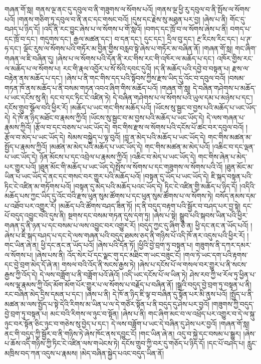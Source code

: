 གཞན་གོ་སླ། གནས་ལྔ་ནང་དུ་དབུལ་བ་ནི་གཟུགས་ལ་སོགས་པའོ། །གནས་ལྔ་ཕྱི་རུ་དབུལ་བ་ནི་སྤོས་ལ་སོགས་པའོ། །གནས་གཅིག་ཏུ་དབུལ་བ་ནི་ནང་དང་གསང་བའོ། །དུས་དང་རྗེས་སུ་མཐུན་པར་བྱ། །ཞེས་པ་ནི། གོང་དུ་བཤད་པ་ཉིད་དོ། །འདི་ནི་རང་བྱུང་ཞེས་པ་ལ་སོགས་པ་གོ་སླའོ། །བགད་དང་ཁྲོ་བ་ལ་སོགས་ཞེས་པ་ནི། བགད་པ་དང་ཁྲོ་བ་དང་། གདུགས་དང་། རྒྱལ་མཚན་དང་། བ་དན་དང་། དུང་དང་། དྲིལ་བུ་དང་། རྔ་{རིངས་རིང་}དང་། པ་ཊ་ཧ་དང་། ལྡོང་རུས་ལ་སོགས་པའི་གཏོར་མ་བྱིན་གྱིས་བརླབ་སྟེ་ཞེས་པ་གཏོར་མ་བཞིན་ནོ། །གཞན་གོ་སླ། གང་ཞིག་གཞན་ལ་ཇི་བཞིན་དུ། །ཞེས་པ་ལ་སོགས་པའི་དོན་ནི་རང་གིས་རང་གི་འཁོར་ལ་མཆོད་པ་དང་། འཁོར་གྱིས་རང་ལ་མཆོད་པ་ལ་སོགས་པ། རང་གི་རྣལ་འབྱོར་པ་སོ་སོའི་དབང་དུའོ། །ད་ནི་མཆོད་པའི་དབྱེ་བ་བསྟན་པ། རྫས་ལ་བརྟེན་ནས་མཆོད་པ་དང་། །ཞེས་པ་ནི་གང་གིས་དད་པའི་སྟོབས་ཀྱིས་རྫས་ཡིད་དུ་འོང་བ་དབུལ་བའོ། །བསམ་གཏན་ཁོ་ནས་མཆོད་པ་ནི་བསམ་གཏན་འབའ་ཞིག་གིས་མཆོད་པའོ། །གཞན་གོ་སླ། དེ་བཞིན་གཤེགས་པ་མཆོད་པ་ཡང་དངོས་སུ་ནི། དང་བ་དང་ཏིང་ངེ་འཛིན་ཏེ། དེ་བཞིན་གཤེགས་པ་ལ་སོགས་པའི་ཡུལ་དམ་པ་མཉེས་པ་དང་། དངོས་གྲུབ་སྩོལ་བའི་ཕྱིར་རོ། །མཆོད་པ་ཡང་གང་གིས་མཆོད་པའོ། །ཡོངས་སུ་སྦྱང་བ་བྱས་པའི་མཆོད་པ་ཡང་ཡོད་དེ། དེ་ཁོ་ན་ཉིད་མཐོང་བ་རྣམས་ཀྱིའོ། །ཡོངས་སུ་སྦྱང་བ་མ་བྱས་པའི་མཆོད་པ་ཡང་ཡོད་དེ། དེ་ལས་གཞན་པ་​ རྣམས་ཀྱིའོ། །རྩོལ་བ་དང་བཅས་པ་ཡང་ཡོད་དེ། གང་གིས་རྫས་ལ་སོགས་པའི་དངོས་པོ་ཚང་བར་དབུལ་བའོ། །རྩོལ་བ་མེད་པ་ཡང་ཡོད་དེ། སེམས་བསྐྱེད་པ་ལྟ་བུའོ། །བླ་ན་མེད་པའི་མཆོད་པ་ཡང་ཡོད་དེ། གང་གིས་མཚན་མ་སྤྱོད་པ་རྣམས་ཀྱིའོ། །མཚན་མ་མེད་པའི་མཆོད་པ་ཡང་ཡོད་དེ། གང་གིས་མཚན་མ་མེད་པའོ། །འཆིང་བ་དང་ལྡན་པ་ཡང་ཡོད་དེ། ཉོན་མོངས་པ་དང་འབྲེལ་པ་རྣམས་ཀྱིའོ། །འཆིང་བ་མེད་པ་ཡང་ཡོད་དེ། གང་གིས་ཞེན་པ་མེད་པར་གྱུར་པའོ། །ཐུན་མོང་གི་མཆོད་པ་ཡང་ཡོད་དེ།སྤོས་ལ་སོགས་པ་དང་གཟུགས་ལ་སོགས་པའི་འོ། །ཐུན་མོང་མ་ཡིན་པ་ཡང་ཡོད་དེ་ནང་དང་གསང་བར་གྱུར་པའི་མཆོད་པའོ། །བསྟན་དུ་ཡོད་པ་ཡང་ཡོད་དེ། ཇི་སྐད་བསྟན་པའི་ཏིང་ངེ་འཛིན་མ་གཏོགས་པའོ། །བསྟན་དུ་མེད་པའི་མཆོད་པའང་ཡོད་དེ། ཏིང་ངེ་འཛིན་གྱི་མཆོད་པ་ཉིད་དོ། །འདིའི་མཆོད་པས་ཀྱང་ཡིད་དུ་འོང་བའི་རྫས་ཕུན་སུམ་ཚོགས་པ་དང་ཕུན་སུམ་ཚོགས་པ་ལ་སོགས་ཏེ། བསོད་ནམས་དམ་པ་འཐོབ་པར་འགྱུར་རོ། །མཆོད་པའི་ཚོགས་བཤད་ཟིན་ཏོ། །ད་ནི་བདུད་བརྟག་པའི་སྦྱོར་བ་བཤད་པར་བྱ་སྟེ། དང་པོ་བདུད་འབྱུང་བའི་དུས་ནི། སྔགས་དང་བསམ་གཏན་དུས་དག་ཏུ། །ཞེས་པ་སྟེ། སྒྲུབ་པའི་སྐབས་ཡིན་པའི་ཕྱིར་གཞན་དུ་ནི་ཉན་པ་དང་བསམ་པ་ལས་འབྱུང་བར་འགྱུར་རོ། །བདུད་ཀྱང་དུ་ཞིག་ཅེ་ན། ཕྱི་དང་ནང་ན་ཡོད་པའོ། །ཞེས་པ་ཇི་སྐད་བཤད་པ་དང་དེ་ལས་གཞན་པའི་བདུད་ཐམས་ཅད་ནི་གཉིས་པོ་འདི་ཁོ་ནར་འདུས་པའི་ཕྱིར་རོ། །གང་ཡིན་ཞེ་ན། ཕྱི་དང་ནང་ན་ཡོད་པའོ། །ཞེས་པའི་དོན་ཏོ། །ཕྱིའི་བྱེ་བྲག་ཏུ་བསྟན་པ། གཟུགས་ནི་དཀར་དམར་ལ་སོགས་པ། །ཞེས་པས་ནི། འོད་སེར་པོ་དང་ལྗང་གུ་དང་མཐིང་ག་ཡང་བཟུང་ངོ། །གལ་ཏེ་ཡང་དག་པའི་རྟགས་དང་བྱེ་བྲག་མེད་དོ་ཞེ་ན། གསལ་བའི་འོད་ནི་སངས་རྒྱས་ཏེ། །ཞེས་པ་དངོས་པོ་ལ་གསལ་བར་གྱུར་པ་ནི་སངས་རྒྱས་ཀྱི་འོད་དེ། དེ་ལས་བཟློག་པ་ནི་བཟློག་པའོ་ཞེའོ། །འདི་ཡང་དངོས་པོ་ལ་ཡིན་ཏེ། ཤེས་རབ་ཀྱི་ཕ་རོལ་ཏུ་ཕྱིན་པ་ལས་ལྷ་རྣམས་ཀྱི་འོད་​ མོག་མོག་པོར་གྱུར་པ་ལ་སོགས་པ་བརྗོད་པ་བཞིན་ནོ། །སྒྲའི་བདུད་བྱེ་བྲག་ཏུ་བསྟན་པ་ནི། རང་བཞིན་མེད་དྲིས་དམན་པ་དང་། །ཞེས་པ་ནི། དེ་ཁོ་ན་ཉིད་ཇི་ལྟ་བ་བཞིན་དུ་སྟོན་པར་མི་ནུས་པའོ། །སྤྱོད་པ་ནི་མཚན་མ་ལས་སྤྱོད་པ་སྟེ་དེའི་རིགས་མ་ཡིན་པ་ལ་དེ་གཙོར་སྟོན་པ་ནི་བདུད་དུ་ཤེས་པར་བྱའོ། །གཟུགས་ཀྱི་བདུད་བྱེ་བྲག་ཏུ་བསྟན་པ། མང་བའི་རིགས་ལ་ཉུང་བ་སྟོན། །ཞེས་པ་ནི། གང་ཞིག་མང་བ་ལ་འཕྲོད་པར་འགྱུར་བ་དེ་ལ་སྐུ་ཉུང་བར་སྟོན་ཅིང་ཉུང་བ་གཅེས་སུ་བྱེད་པ་དང་། དེ་ལས་བཟློག་པ་ཡང་དེ་བཞིན་དུ་ཤེས་པར་བྱའོ། །གཞན་གོ་སླ། ནང་གི་བདུད་ཀྱི་སྦྱོར་བ་ནི་གཉིས་ཏེ་ཞེས་ཁོང་ནས་དབྱུང་ངོ། །གང་ཡིན་ཞེ་ན། འདུ་བ་སྐྱེ་དང་བསམ་པ་སྒྱུར། །ཞེས་པ་ཆོས་འདི་གཉིས་ཀྱི་ཏིང་ངེ་འཛིན་ལས་གཡེངས་ཏེ། དངོས་གྲུབ་ཀྱི་བར་དུ་གཅོད་པ་ཉིད་དོ། །དང་པོ་བཤད་པ། རླུང་མཁྲིས་བད་ཀན་འདུས་པ་རྣམས། །མེད་བཞིན་སྐྱེད་པའང་བདུད་ཡིན་ནོ། 